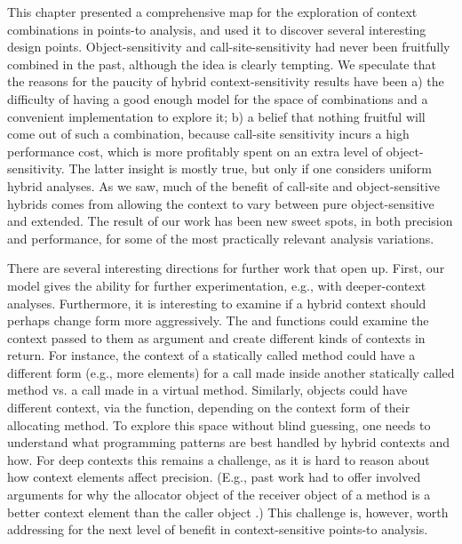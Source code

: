 This chapter presented a comprehensive map for the exploration of context combinations in points-to analysis, and used it to discover several interesting design points. Object-sensitivity and call-site-sensitivity had never been fruitfully combined in the past, although the idea is clearly tempting. We speculate that the reasons for the paucity of hybrid context-sensitivity results have been a) the difficulty of having a good enough model for the space of combinations and a convenient implementation to explore it; b) a belief that nothing fruitful will come out of such a combination, because call-site sensitivity incurs a high performance cost, which is more profitably spent on an extra level of object-sensitivity. The latter insight is mostly true, but only if one considers uniform hybrid analyses. As we saw, much of the benefit of call-site and object-sensitive hybrids comes from allowing the context to vary between pure object-sensitive and extended. The result of our work has been new sweet spots, in both precision and performance, for some of the most practically relevant analysis variations.

There are several interesting directions for further work that open up. First, our model gives the ability for further experimentation, e.g., with deeper-context analyses. Furthermore, it is interesting to examine if a hybrid context should perhaps change form more aggressively. The  and  functions could examine the context passed to them as argument and create different kinds of contexts in return. For instance, the context of a statically called method could have a different form (e.g., more elements) for a call made inside another statically called method vs. a call made in a virtual method. Similarly, objects could have different context, via the  function, depending on the context form of their allocating method. To explore this space without blind guessing, one needs to understand what programming patterns are best handled by hybrid contexts and how. For deep contexts this remains a challenge, as it is hard to reason about how context elements affect precision. (E.g., past work had to offer involved arguments for why the allocator object of the receiver object of a method is a better context element than the caller object  \cite{popl:2011:Smaragdakis}.) This challenge is, however, worth addressing for the next level of benefit in context-sensitive points-to analysis.